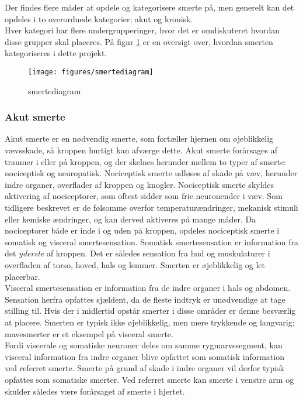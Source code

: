 Der findes flere måder at opdele og kategorisere smerte på, men generelt kan det opdeles i to overordnede kategorier; akut og kronisk. \\
Hver kategori har flere undergrupperinger, hvor det er omdiskuteret hvordan disse grupper skal placeres. \citep{Giangragorio1997} På figur \ref{smertediagram} er en oversigt over, hvordan smerten kategoriseres i dette projekt.

\begin{figure}[H]
	\caption{smertediagram}
	\label{smertediagram}
	\centering
	\texttt{[image: figures/smertediagram]}
	\flushleft
\end{figure}

\subsubsection{Akut smerte}
Akut smerte er en nødvendig smerte, som fortæller hjernen om øjeblikkelig vævsskade, så kroppen hurtigt kan afværge dette. Akut smerte forårsages af traumer i eller på kroppen, og der skelnes herunder mellem to typer af smerte: nociceptisk og neuropatisk. Nociceptisk smerte udløses af skade på væv, herunder indre organer, overflader af kroppen og knogler. Nociceptisk smerte skyldes aktivering af nociceptorer, som oftest sidder som frie neuronender i væv. Som tidligere beskrevet er de følsomme overfor temperaturændringer, mekanisk stimuli eller kemiske ændringer, og kan derved aktiveres på mange måder. Da nociceptorer både er inde i og uden på kroppen, opdeles nociceptisk smerte i somatisk og visceral smertesensation. Somatisk smertesensation er information fra det \textit{yderste} af kroppen. Det er således sensation fra hud og muskulaturer i overfladen af torso, hoved, hals og lemmer. \citep{Martini} Smerten er øjeblikkelig og let placerbar. \\
Visceral smertesensation er information fra de indre organer i hals og abdomen. Sensation herfra opfattes sjældent, da de fleste indtryk er unødvendige at tage stilling til. Hvis der i midlertid opstår smerter i disse områder er denne besværlig at placere. Smerten er typisk ikke øjeblikkelig, men mere trykkende og langvarig; mavesmerter er et eksempel på visceral smerte. \\
Fordi viscerale og somatiske neuroner deles om samme rygmarvssegment, kan visceral information fra indre organer blive opfattet som somatisk information ved referret smerte. Smerte på grund af skade i indre organer vil derfor typisk opfattes som somatiske smerter. Ved referret smerte kan smerte i venstre arm og skulder således være forårsaget af smerte i hjertet.

